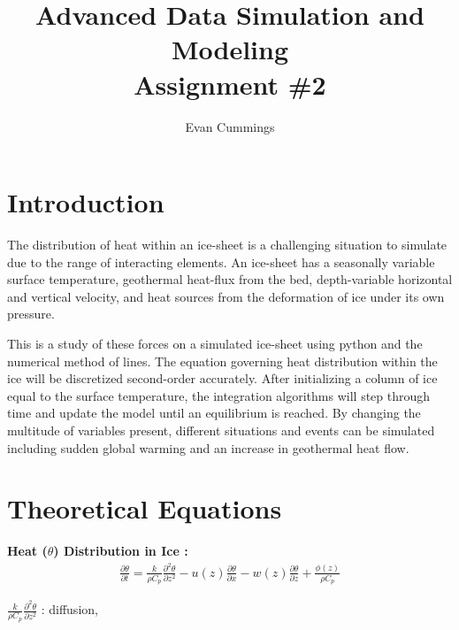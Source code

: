 \documentclass{article}%
\begin{document}
\title{Advanced Data Simulation and Modeling\\
       Assignment \#2\\}
\author{Evan Cummings}
\maketitle

\twocolumn

\section{Introduction}

The distribution of heat within an ice-sheet is a challenging situation to simulate due to the range of interacting elements.  An ice-sheet has a seasonally variable surface temperature, geothermal heat-flux from the bed, depth-variable horizontal and vertical velocity, and heat sources from the deformation of ice under its own pressure.

This is a study of these forces on a simulated ice-sheet using python and the numerical method of lines.  The equation governing heat distribution within the ice will be discretized second-order accurately.  After initializing a column of ice equal to the surface temperature, the integration algorithms will step through time and update the model until an equilibrium is reached.  By changing the multitude of variables present, different situations and events can be simulated including sudden global warming and an increase in geothermal heat flow.

\section{Theoretical Equations}

\textbf{Heat ($\theta$) Distribution in Ice :}
\begin{align*}
	\frac{\partial \theta}{\partial t} = 
	  \frac{k}{\rho C_p} \frac{\partial^2 \theta}{\partial z^2} - 
	  u(z) \frac{\partial \theta}{\partial x} - 
	  w(z) \frac{\partial \theta}{\partial z} + 
	  \frac{\phi(z)}{\rho C_p} 
\end{align*}

$\frac{k}{\rho C_p} \frac{\partial^2 \theta}{\partial z^2}$ : diffusion,
\end{document}
